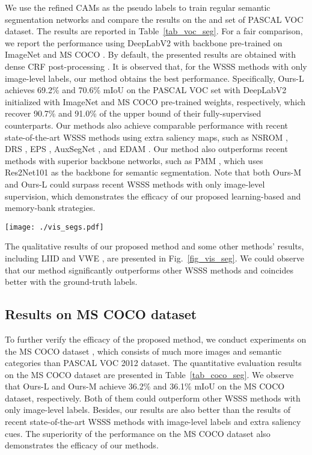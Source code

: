 \par We use the refined CAMs as the pseudo labels to train regular semantic segmentation networks and compare the results on the  and  set of PASCAL VOC dataset. The results are reported in Table~\ref{tab_voc_seg}. For a fair comparison, we report the performance using DeepLabV2 with backbone pre-trained on ImageNet \citep{chen2017deeplab} and MS COCO \citep{lin2014microsoft}. By default, the presented results are obtained with dense CRF post-processing \citep{krahenbuhl2011efficient}. It is observed that, for the WSSS methods with only image-level labels, our method obtains the best performance. Specifically, Ours-L achieves 69.2\% and 70.6\% mIoU on the PASCAL VOC  set with DeepLabV2 initialized with ImageNet and MS COCO pre-trained weights, respectively, which recover 90.7\% and 91.0\% of the upper bound of their fully-supervised counterparts. Our methods also achieve comparable performance with recent state-of-the-art WSSS methods using extra saliency maps, such as NSROM \citep{yao2021non}, DRS \citep{kim2021discriminative}, EPS \citep{lee2021railroad}, AuxSegNet \citep{xu2021leveraging}, and EDAM \citep{wu2021embedded}. Our method also outperforms recent methods with superior backbone networks, such as PMM \citep{li2021pseudo}, which uses Res2Net101 \citep{gao2021res2net} as the backbone for semantic segmentation. Note that both Ours-M and Ours-L could surpass recent WSSS methods with only image-level supervision, which demonstrates the efficacy of our proposed learning-based and memory-bank strategies.

\begin{figure*}[htp]
  \centering
  \texttt{[image: ./vis\_segs.pdf]}
  \caption{Examples of the predicted segmentation from PASCAL VOC  and  set.}
  \label{fig_vis_seg}
\end{figure*}
\par The qualitative results of our proposed method and some other methods' results, including LIID \citep{liu2020leveraging} and VWE \citep{ru2021learning}, are presented in Fig.~\ref{fig_vis_seg}. We could observe that our method significantly outperforms other WSSS methods and coincides better with the ground-truth labels.



\subsection{Results on MS COCO dataset}
\par To further verify the efficacy of the proposed method, we conduct experiments on the MS COCO dataset \citep{lin2014microsoft}, which consists of much more images and semantic categories than PASCAL VOC 2012 dataset. The quantitative evaluation results on the MS COCO dataset are presented in Table~\ref{tab_coco_seg}. We observe that Ours-L and Ours-M achieve 36.2\% and 36.1\% mIoU on the MS COCO  dataset, respectively. Both of them could outperform other WSSS methods with only image-level labels. Besides, our results are also better than the results of recent state-of-the-art WSSS methods with image-level labels and extra saliency cues. The superiority of the performance on the MS COCO dataset also demonstrates the efficacy of our methods.

